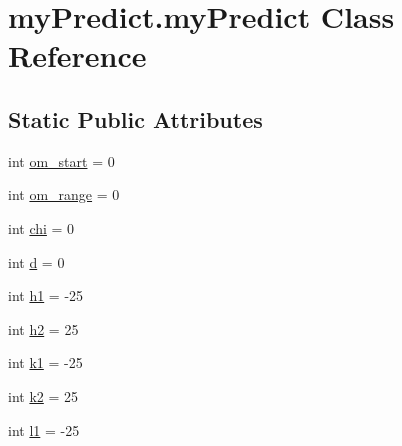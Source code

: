\hypertarget{classmy_predict_1_1my_predict}{\section{my\-Predict.\-my\-Predict Class Reference}
\label{classmy_predict_1_1my_predict}
}
\subsection*{Static Public Attributes}
\begin{DoxyCompactItemize}
\item 
int \hyperlink{classmy_predict_1_1my_predict_a22120f9618f06acd8650c15c08825c80}{om\-\_\-start} = 0
\item 
int \hyperlink{classmy_predict_1_1my_predict_a4b21c39ba945630d9b575427e578ca96}{om\-\_\-range} = 0
\item 
int \hyperlink{classmy_predict_1_1my_predict_a628dfab0d8a8cd900af38f69d58ea96a}{chi} = 0
\item 
int \hyperlink{classmy_predict_1_1my_predict_ad000055f5486abf5e3ad766e1170775f}{d} = 0
\item 
int \hyperlink{classmy_predict_1_1my_predict_abf3a46e4bd94b6d14263dacd22c9cb24}{h1} = -\/25
\item 
int \hyperlink{classmy_predict_1_1my_predict_a1193984f0a6fde8ddbca73c1c027294a}{h2} = 25
\item 
int \hyperlink{classmy_predict_1_1my_predict_a36f7425581e5d92e7ae40a14c731cc9c}{k1} = -\/25
\item 
int \hyperlink{classmy_predict_1_1my_predict_a25decbee9aa99c6106854776fdeca4bb}{k2} = 25
\item 
int \hyperlink{classmy_predict_1_1my_predict_a6b9c00f63edbf64fb570418b1f1a6905}{l1} = -\/25
\end{DoxyCompactItemize}


